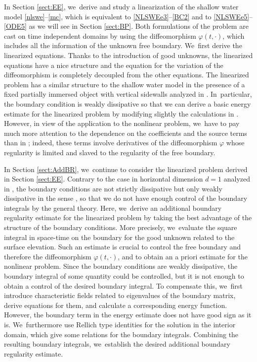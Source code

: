 \documentclass[JEP,XML,SOM,Unicode,NoFloatCountersInSection,published]{cedram}
\theoremstyle{definition}
\begin{document}
In Section \ref{sect:EE}, we~derive and study a linearization of the shallow water model \eqref{nlswe}--\eqref{mc}, which is equivalent to
\eqref{NLSWEe3}--\eqref{BC2} and to \eqref{NLSWEe5}--\eqref{ODE5} as we will see in Section \ref{sect:BP}.
Both formulations of the problem are cast on time independent domains by using the diffeomorphism $\varphi(t,\cdot)$,
which includes all the information of the unknown free boundary. We~first derive the linearized equations.
Thanks to the introduction of good unknowns, the linearized equations have a nice structure and the equation for the variation of the diffeomorphism is completely
decoupled from the other equations.
The linearized problem has a similar structure to the shallow water model in the presence of a fixed partially immersed object with vertical sidewalls
analyzed in \cite{IguchiLannes2023}. In~particular, the boundary condition is weakly dissipative so that
we can derive a basic energy estimate for the linearized problem by modifying slightly the calculations in \cite{IguchiLannes2023}.
However, in view of the application to the nonlinear problem, we~have to pay much more attention to the dependence on the coefficients and the source terms
than in \cite{IguchiLannes2023};
indeed, these terms involve derivatives of the diffeomorphism $\varphi$ whose regularity is limited and slaved to the regularity of the free boundary.

In Section \ref{sect:AddBR}, we~continue to consider the linearized problem derived in Section \ref{sect:EE}.
Contrary to the case in horizontal dimension $d=1$ analyzed in \cite{IguchiLannes2021},
the boundary conditions are not strictly dissipative but only weakly dissipative in the sense \cite{IguchiLannes2023},
so that we do not have enough control of the boundary integrals by the general theory.
Here, we~derive an additional boundary regularity estimate for the linearized problem by taking the best advantage of the structure of the boundary conditions.
More precisely, we~evaluate the square integral in space-time on the boundary for the good unknown related to the surface elevation.
Such an estimate is crucial to control the free boundary and therefore the diffeomorphism $\varphi(t,\cdot)$,
and to obtain an a priori estimate for the nonlinear problem.
Since the boundary conditions are weakly dissipative, the boundary integral of some quantity could be controlled,
but it is not enough to obtain a control of the desired boundary integral.
To compensate this, we~first introduce characteristic fields related to eigenvalues of the boundary matrix,
derive equations for them, and calculate a corresponding energy function.
However, the boundary term in the energy estimate does not have good sign as it is. We~furthermore use Rellich type identities for the solution in the interior domain, which give some relations for the boundary integrals.
Combining the resulting boundary integrals, we~establish the desired additional boundary regularity estimate.
\end{document}

